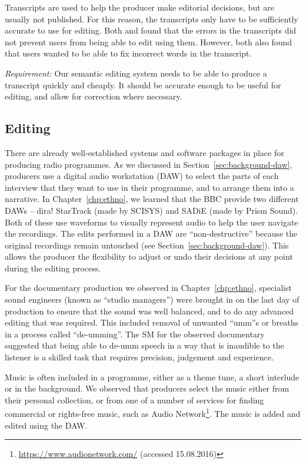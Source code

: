 Transcripts are used to help the producer make editorial decisions, but are usually not published. For this reason, the
transcripts only have to be sufficiently accurate to use for editing. Both \citet{Whittaker2004} and
\citet{Sivaraman2016} found that the errors in the transcripts did not prevent users from being able to edit using
them. However, both also found that users wanted to be able to fix incorrect words in the transcript.

\textit{Requirement:} Our semantic editing system needs to be able to produce a transcript quickly and cheaply. It
should be accurate enough to be useful for editing, and allow for correction where necessary.

\subsection{Editing}
There are already well-established systems and software packages in place for producing radio programmes. As we discussed in
Section~\ref{sec:background-daw}, producers use a digital audio workstation (DAW) to select the parts of each interview
that they want to use in their programme, and to arrange them into a narrative. In Chapter~\ref{chp:ethno}, we learned
that the BBC provide two different DAWs --
dira! StarTrack (made by SCISYS) and SADiE (made by Prism Sound).
Both of these use waveforms to visually represent audio to help the user navigate the recordings. The edits performed
in a DAW are ``non-destructive'' because the original recordings remain untouched (see
Section~\ref{sec:background-daw}). This allows the producer the flexibility to adjust or undo their decisions at any
point during the editing process.

For the documentary production we observed in Chapter~\ref{chp:ethno}, specialist sound engineers (known as ``studio
managers'') were brought in on the last day of production to ensure that the sound was well balanced, and to do any
advanced editing that was required. This included removal of unwanted ``umm''s or breaths in a process called
``de-umming''. The SM for the observed documentary suggested that being able to de-umm speech in a way that is
inaudible to the listener is a skilled task that requires precision, judgement and experience.

Music is often included in a programme, either as a theme tune, a short interlude or in the background. We observed
that producers
select the music either from their personal collection, or from one of a number of services for finding
commercial or rights-free music, such as Audio Network\footnote{\url{https://www.audionetwork.com/} (accessed
15.08.2016)}.  The music is added and edited using the DAW.

